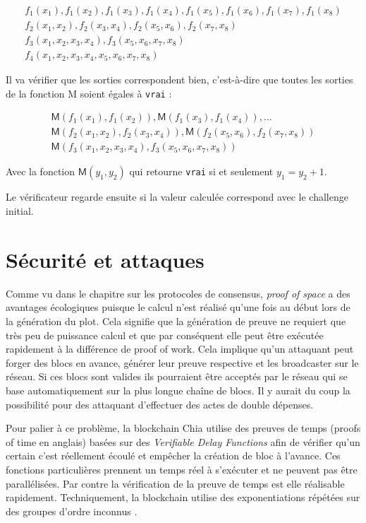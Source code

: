 \begin{gather*}
  f_1(x_1), f_1(x_2), f_1(x_3), f_1(x_4), f_1(x_5), f_1(x_6), f_1(x_7), f_1(x_8) \\
  f_2(x_1,x_2), f_2(x_3,x_4), f_2(x_5,x_6), f_2(x_7,x_8) \\
  f_3(x_1,x_2,x_3,x_4), f_3(x_5,x_6,x_7,x_8) \\
  f_4(x_1,x_2,x_3,x_4,x_5,x_6,x_7,x_8)
\end{gather*}

Il va vérifier que les sorties correspondent bien, c'est-à-dire que toutes les sorties de la fonction \textsf{M} soient égales à \texttt{vrai} :

\begin{gather*}
  \mathsf{M}(f_1(x_1), f_1(x_2)),\mathsf{M}(f_1(x_3), f_1(x_4)),\dots \\
  \mathsf{M}(f_2(x_1,x_2),f_2(x_3,x_4)),\mathsf{M}(f_2(x_5,x_6),f_2(x_7,x_8)) \\
  \mathsf{M}(f_3(x_1,x_2,x_3,x_4), f_3(x_5,x_6,x_7,x_8))
\end{gather*}

Avec la fonction $\mathsf{M}(y_1,y_2)$ qui retourne \texttt{vrai} si et seulement $y_1 = y_2 + 1$.

Le vérificateur regarde ensuite si la valeur calculée correspond avec le challenge initial.

\section{Sécurité et attaques}

Comme vu dans le chapitre sur les protocoles de consensus, \emph{proof of space} a des avantages écologiques puisque le calcul n'est réalisé qu'une fois au début lors de la génération du plot. Cela signifie que la génération de preuve ne requiert que très peu de puissance calcul et que par conséquent elle peut être exécutée rapidement à la différence de proof of work. Cela implique qu'un attaquant peut forger des blocs en avance, générer leur preuve respective et les broadcaster sur le réseau. Si ces blocs sont valides ils pourraient être acceptés par le réseau qui se base automatiquement sur la plus longue chaîne de blocs. Il y aurait du coup la possibilité pour des attaquant d'effectuer des actes de double dépenses.

Pour palier à ce problème, la blockchain Chia utilise des preuves de temps (proofs of time en anglais) basées sur des \emph{Verifiable Delay Functions} afin de vérifier qu'un certain c'est réellement écoulé et empêcher la création de bloc à l'avance. Ces fonctions particulières prennent un temps réel à s'exécuter et ne peuvent pas être parallélisées. Par contre la vérification de la preuve de temps est elle réalisable rapidement. Techniquement, la blockchain utilise des exponentiations répétées sur des groupes d'ordre inconnus \cite{DBLP:conf/crypto/BonehBBF18} \cite{DBLP:conf/innovations/Pietrzak19a} \cite{DBLP:conf/eurocrypt/Wesolowski19}.

